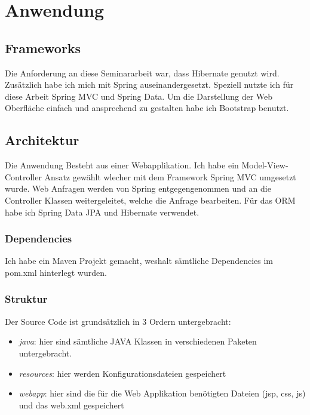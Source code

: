 \chapter{Anwendung}
\label{sec:Anwendung}

\section{Frameworks}
Die Anforderung an diese Seminararbeit war, dass Hibernate genutzt wird.
Zusätzlich habe ich mich mit Spring auseinandergesetzt. Speziell nutzte ich für diese Arbeit Spring MVC und Spring Data. Um die Darstellung der Web Oberfläche einfach und ansprechend zu gestalten habe ich Bootstrap \cite{Bootstrap} benutzt.

\section{Architektur}
Die Anwendung Besteht aus einer Webapplikation. Ich habe ein Model-View-Controller Ansatz gewählt wlecher mit dem Framework Spring MVC umgesetzt wurde. Web Anfragen werden von Spring entgegengenommen und an die Controller Klassen weitergeleitet, welche die Anfrage bearbeiten. Für das ORM habe ich Spring Data JPA und Hibernate verwendet.

\subsection{Dependencies}
Ich habe ein Maven Projekt gemacht, weshalt sämtliche Dependencies im pom.xml hinterlegt wurden.

\subsection{Struktur}
Der Source Code ist grundsätzlich in 3 Ordern untergebracht:
\begin{itemize}
	\item \emph{java}: hier sind sämtliche JAVA Klassen in verschiedenen Paketen untergebracht.
	\item \emph{resources}: hier werden Konfigurationsdateien gespeichert
	\item \emph{webapp}: hier sind die für die Web Applikation benötigten Dateien (jsp, css, js) und das web.xml gespeichert
\end{itemize}

